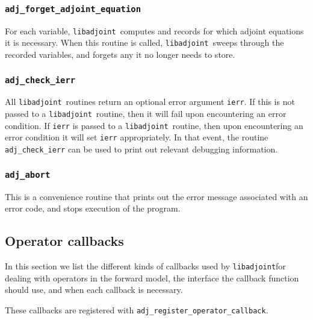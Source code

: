 \documentclass[10pt,authoryear]{elsarticle}
\newcommand{\libadjoint}[0]{{\texttt{libadjoint}}}
\begin{document}
\subsubsection{\texttt{adj\_forget\_adjoint\_equation}}
For each variable, \libadjoint\ computes and records for which adjoint equations it is necessary.
When this routine is called, \libadjoint\ sweeps through the recorded variables,
and forgets any it no longer needs to store.

\subsubsection{\texttt{{adj\_check\_ierr}}}
All \libadjoint\ routines return an optional error argument \texttt{ierr}. If this is not passed to a \libadjoint\ routine,
then it will fail upon encountering an error condition. If \texttt{ierr} is passed to a \libadjoint\ routine, then
upon encountering an error condition it will set \texttt{ierr} appropriately. In that event, the routine \texttt{adj\_check\_ierr}
can be used to print out relevant debugging information.

\subsubsection{\texttt{{adj\_abort}}}
This is a convenience routine that prints out the error message associated with an error code, and stops execution of
the program.

\subsection{Operator callbacks} \label{sec:operator_callbacks}
In this section we list the different kinds of callbacks used by \libadjoint for dealing with
operators in the forward model, the interface
the callback function should use, and when each callback is necessary.

These callbacks are registered with \texttt{adj\_register\_operator\_callback}.
\end{document}
